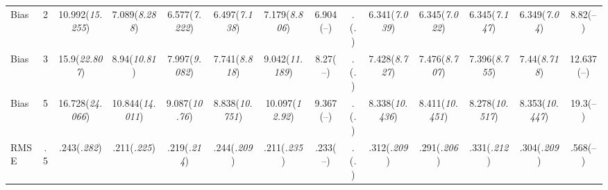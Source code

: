 \documentclass{article}
\begin{document}
\begin{table}[tbp]
{\begin{tabularx}{\textwidth}{lCCCCCCCCCCCCC}
Bias&2&10.992\newline (\emph{15.255})&7.089\newline (\emph{8.288})&6.577\newline (\emph{7.222})&6.497\newline (\emph{7.138})&7.179\newline (\emph{8.806})&6.904\newline (--)&.\newline (\emph{.})&6.341\newline (\emph{7.039})&6.345\newline (\emph{7.022})&6.345\newline (\emph{7.147})&6.349\newline (\emph{7.04})&8.82\newline (--) \tabularnewline
Bias&3&15.9\newline (\emph{22.807})&8.94\newline (\emph{10.81})&7.997\newline (\emph{9.082})&7.741\newline (\emph{8.818})&9.042\newline (\emph{11.189})&8.27\newline (--)&.\newline (\emph{.})&7.428\newline (\emph{8.727})&7.476\newline (\emph{8.707})&7.396\newline (\emph{8.755})&7.44\newline (\emph{8.718})&12.637\newline (--) \tabularnewline
Bias&5&16.728\newline (\emph{24.066})&10.844\newline (\emph{14.011})&9.087\newline (\emph{10.76})&8.838\newline (\emph{10.751})&10.097\newline (\emph{12.92})&9.367\newline (--)&.\newline (\emph{.})&8.338\newline (\emph{10.436})&8.411\newline (\emph{10.451})&8.278\newline (\emph{10.517})&8.353\newline (\emph{10.447})&19.3\newline (--) \tabularnewline
\midrule RMSE&.5&.243\newline (\emph{.282})&.211\newline (\emph{.225})&.219\newline (\emph{.214})&.244\newline (\emph{.209})&.211\newline (\emph{.235})&.233\newline (--)&.\newline (\emph{.})&.312\newline (\emph{.209})&.291\newline (\emph{.206})&.331\newline (\emph{.212})&.304\newline (\emph{.209})&.568\newline (--) \tabularnewline

\end{tabularx}}
\end{table}
\end{document}
